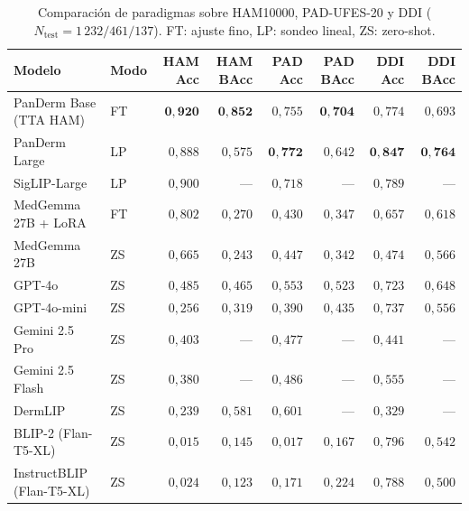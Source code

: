 \begin{table}[H]
\centering
\footnotesize
\setlength{\tabcolsep}{4pt}
\renewcommand{\arraystretch}{0.95}
\caption{Comparación de paradigmas sobre HAM10000, PAD-UFES-20 y DDI
($N_{\mathrm{test}} = 1\,232 / 461 / 137$). FT: ajuste fino, LP:
sondeo lineal, ZS: zero-shot.}
\label{tab:llm-comparativa}
\begin{tabular}{llrrrrrr}
\hline
Modelo                 & Modo  & HAM Acc       & HAM BAcc      & PAD Acc       & PAD BAcc      & DDI Acc       & DDI BAcc \\
\hline
PanDerm Base (TTA HAM) & FT    & $\mathbf{0{,}920}$ & $\mathbf{0{,}852}$ & $0{,}755$     & $\mathbf{0{,}704}$ & $0{,}774$     & $0{,}693$ \\
PanDerm Large          & LP    & $0{,}888$     & $0{,}575$     & $\mathbf{0{,}772}$ & $0{,}642$     & $\mathbf{0{,}847}$ & $\mathbf{0{,}764}$ \\
SigLIP-Large           & LP    & $0{,}900$     & ---           & $0{,}718$     & ---           & $0{,}789$     & --- \\
MedGemma 27B + LoRA    & FT    & $0{,}802$     & $0{,}270$     & $0{,}430$     & $0{,}347$     & $0{,}657$     & $0{,}618$ \\
MedGemma 27B           & ZS    & $0{,}665$     & $0{,}243$     & $0{,}447$     & $0{,}342$     & $0{,}474$     & $0{,}566$ \\
GPT-4o                 & ZS    & $0{,}485$     & $0{,}465$     & $0{,}553$     & $0{,}523$     & $0{,}723$     & $0{,}648$ \\
GPT-4o-mini            & ZS    & $0{,}256$     & $0{,}319$     & $0{,}390$     & $0{,}435$     & $0{,}737$     & $0{,}556$ \\
Gemini 2.5 Pro         & ZS    & $0{,}403$     & ---           & $0{,}477$     & ---           & $0{,}441$     & --- \\
Gemini 2.5 Flash       & ZS    & $0{,}380$     & ---           & $0{,}486$     & ---           & $0{,}555$     & --- \\
DermLIP                & ZS    & $0{,}239$     & $0{,}581$     & $0{,}601$     & ---           & $0{,}329$     & --- \\
BLIP-2 (Flan-T5-XL)    & ZS    & $0{,}015$     & $0{,}145$     & $0{,}017$     & $0{,}167$     & $0{,}796$     & $0{,}542$ \\
InstructBLIP (Flan-T5-XL)& ZS  & $0{,}024$     & $0{,}123$     & $0{,}171$     & $0{,}224$     & $0{,}788$     & $0{,}500$ \\
\hline
\end{tabular}
\end{table}

